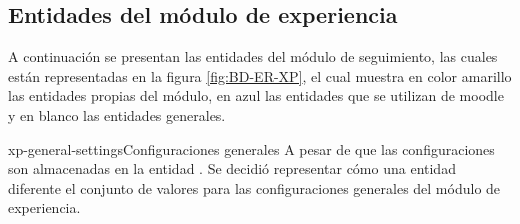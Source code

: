 \clearpage
\subsection{Entidades del módulo de experiencia}


 A continuación se presentan las entidades del módulo de seguimiento,
 las cuales están representadas en la figura  \ref{fig:BD-ER-XP},
 el cual muestra en color amarillo las entidades propias del módulo,
 en azul las entidades que se utilizan de moodle  y en blanco las entidades generales.


    \begin{cdtEntidad}{xp-general-settings}{Configuraciones generales}{
    A pesar de que las configuraciones son almacenadas en la entidad
    . Se decidió representar cómo una entidad diferente
    el conjunto de valores para las configuraciones generales del módulo de
    experiencia.}


    \end{cdtEntidad}

